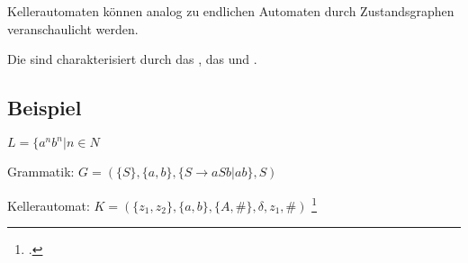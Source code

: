 \documentclass{lehramt-informatik-haupt}
\begin{document}
Kellerautomaten können analog zu endlichen Automaten durch
Zustandsgraphen veranschaulicht werden.

Die  sind charakterisiert durch das
, das  und
.

\subsection{Beispiel}

$L = \{ a^n b^n | n \in \mathbb{Ν}$

Grammatik:
$G = (\{S \}, \{a, b\}, \{ S \rightarrow aSb | ab \}, S)$

Kellerautomat:
$K = (\{z_1, z_2 \}, \{ a, b \}, \{ A, \# \}, \delta, z_1, \#)$
\footcite[Seite 23]{theo:fs:2}
\literatur
\end{document}

